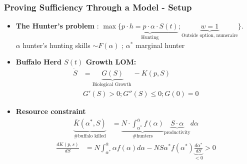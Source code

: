\documentclass[aspectratio=169, 12pt, final]{beamer}
\begin{document}




\begin{frame}
\frametitle{Proving Sufficiency Through a Model - Setup}
\begin{itemize}
	\item \textbf{The Hunter's problem}  : $\max \{\underbrace{p \cdot h = p \cdot \alpha \cdot S(t)}_{\text{Hunting}} ; \underbrace{w = 1}_{\text{Outside option, numeraire}} \}$.
\\ 
\footnotesize{$\alpha$ hunter's hunting skills $\sim F(\alpha)$} ; $\alpha^*$ marginal hunter
\item  \textbf{Buffalo Herd $S(t)$ Growth LOM:} 
 \begin{align*}
 	\dot{S} &= \underbrace{G(S)}_{\text{Biological Growth }} - K(p, S) \\
 	& G'(S) > 0 ; G''(S) \leq 0 ; G(0) = 0
 \end{align*}
\item \textbf{Resource constraint} 
\begin{align*}
 	\underbrace{\bar{K}(\alpha^*, S)}_{\text{\# buffalo killed}} &= \underbrace{N\cdot \int_{\alpha^*}^{\bar{\alpha}} f(\alpha)}_{\text{\# hunters}} \underbrace{S \cdot \alpha}_{\text{productivity}} d\alpha
 \end{align*} 
  \begin{align*}
 	\frac{d K(p,s)}{dS} &= N \int_{\alpha^*}^{\bar{\alpha}} \alpha f(\alpha) d\alpha - NS \alpha^* f(\alpha^*) \underbrace{\frac{d \alpha^*}{dS}}_{< 0} > 0
 \end{align*}
\end{itemize}
\end{frame}
\end{document}
